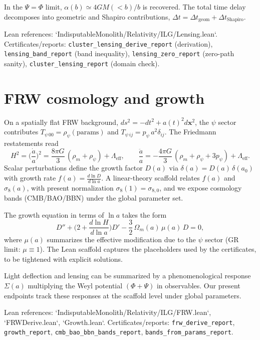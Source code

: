 \documentclass[11pt]{article}
\begin{document}
In the $\Psi=\Phi$ limit, $\alpha(b) \simeq 4GM(<b)/b$ is recovered. The total time delay decomposes into geometric and Shapiro contributions, $\Delta t = \Delta t_{\mathrm{geom}} + \Delta t_{\mathrm{Shapiro}}$.

Lean references: `IndisputableMonolith/Relativity/ILG/Lensing.lean`. Certificates/reports: \texttt{cluster\_lensing\_derive\_report} (derivation), \texttt{lensing\_band\_report} (band inequality), \texttt{lensing\_zero\_report} (zero-path sanity), \texttt{cluster\_lensing\_report} (domain check).

\section{FRW cosmology and growth}
On a spatially flat FRW background, $ds^2=-dt^2+a(t)^2 d\bm{x}^2$, the $\psi$ sector contributes $T_{\psi\,00}=\rho_\psi(\text{params})$ and $T_{\psi\,ij}=p_\psi\,a^2\delta_{ij}$. The Friedmann restatements read
\begin{equation}
  H^2 = \Big(\frac{\dot a}{a}\Big)^2 = \frac{8\pi G}{3}\,(\rho_m + \rho_\psi) + \Lambda_{\mathrm{eff}},\qquad
  \frac{\ddot a}{a} = -\frac{4\pi G}{3}\,(\rho_m+\rho_\psi+3p_\psi) + \Lambda_{\mathrm{eff}}.
\end{equation}
Scalar perturbations define the growth factor $D(a)$ via $\delta(a)=D(a)\,\delta(a_0)$ with growth rate $f(a)=\frac{d\ln D}{d\ln a}$. A linear-theory scaffold relates $f(a)$ and $\sigma_8(a)$, with present normalization $\sigma_8(1)=\sigma_{8,0}$, and we expose cosmology bands (CMB/BAO/BBN) under the global parameter set.

The growth equation in terms of $\ln a$ takes the form
\begin{equation}
  D'' + \Big( 2 + \frac{d\ln H}{d\ln a} \Big) D' - \frac{3}{2}\, \Omega_m(a)\, \mu(a)\, D = 0,
\end{equation}
where $\mu(a)$ summarizes the effective modification due to the $\psi$ sector (GR limit: $\mu\equiv 1$). The Lean scaffold captures the placeholders used by the certificates, to be tightened with explicit solutions.

Light deflection and lensing can be summarized by a phenomenological response $\Sigma(a)$ multiplying the Weyl potential $(\Phi+\Psi)$ in observables. Our present endpoints track these responses at the scaffold level under global parameters.

Lean references: `IndisputableMonolith/Relativity/ILG/FRW.lean`, `FRWDerive.lean`, `Growth.lean`. Certificates/reports: \texttt{frw\_derive\_report}, \texttt{growth\_report}, \texttt{cmb\_bao\_bbn\_bands\_report}, \texttt{bands\_from\_params\_report}.
\end{document}
